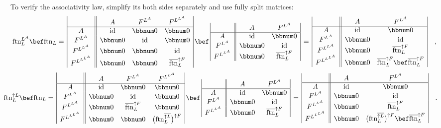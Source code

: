 To verify the associativity law, simplify its both sides separately
and use fully split matrices:
\[
\text{ftn}_{L}^{L^{A}}\bef\text{ftn}_{L}=\,\begin{array}{|c||ccc|}
 & A & F^{L^{A}} & F^{L^{L^{A}}}\\
\hline A & \text{id} & \bbnum 0 & \bbnum 0\\
F^{L^{A}} & \bbnum 0 & \text{id} & \bbnum 0\\
F^{L^{L^{A}}} & \bbnum 0 & \bbnum 0 & \text{id}\\
F^{L^{L^{L^{A}}}} & \bbnum 0 & \bbnum 0 & \overline{\text{ftn}}_{L}^{\uparrow F}
\end{array}\,\bef\,\begin{array}{|c||cc|}
 & A & F^{L^{A}}\\
\hline A & \text{id} & \bbnum 0\\
F^{L^{A}} & \bbnum 0 & \text{id}\\
F^{L^{L^{A}}} & \bbnum 0 & \overline{\text{ftn}}_{L}^{\uparrow F}
\end{array}\,=\,\begin{array}{|c||cc|}
 & A & F^{L^{A}}\\
\hline A & \text{id} & \bbnum 0\\
F^{L^{A}} & \bbnum 0 & \text{id}\\
F^{L^{L^{A}}} & \bbnum 0 & \overline{\text{ftn}}_{L}^{\uparrow F}\\
F^{L^{L^{L^{A}}}} & \bbnum 0 & \overline{\text{ftn}}_{L}^{\uparrow F}\bef\overline{\text{ftn}}_{L}^{\uparrow F}
\end{array}\quad,
\]
\[
\negthickspace\negthickspace\negthickspace\negthickspace\text{ftn}_{L}^{\uparrow L}\bef\text{ftn}_{L}=\,\begin{array}{|c||ccc|}
 & A & F^{L^{A}} & F^{L^{L^{A}}}\\
\hline A & \text{id} & \bbnum 0 & \bbnum 0\\
F^{L^{A}} & \bbnum 0 & \text{id} & \bbnum 0\\
F^{L^{L^{A}}} & \bbnum 0 & \overline{\text{ftn}}_{L}^{\uparrow F} & \bbnum 0\\
F^{L^{L^{L^{A}}}} & \bbnum 0 & \bbnum 0 & \big(\text{ftn}_{L}^{\overline{\uparrow L}}\big)^{\uparrow F}
\end{array}\,\bef\,\begin{array}{|c||cc|}
 & A & F^{L^{A}}\\
\hline A & \text{id} & \bbnum 0\\
F^{L^{A}} & \bbnum 0 & \text{id}\\
F^{L^{L^{A}}} & \bbnum 0 & \overline{\text{ftn}}_{L}^{\uparrow F}
\end{array}\,=\,\begin{array}{|c||cc|}
 & A & F^{L^{A}}\\
\hline A & \text{id} & \bbnum 0\\
F^{L^{A}} & \bbnum 0 & \text{id}\\
F^{L^{L^{A}}} & \bbnum 0 & \overline{\text{ftn}}_{L}^{\uparrow F}\\
F^{L^{L^{L^{A}}}} & \bbnum 0 & \big(\text{ftn}_{L}^{\overline{\uparrow L}}\big)^{\uparrow F}\bef\overline{\text{ftn}}_{L}^{\uparrow F}
\end{array}\quad.
\]
